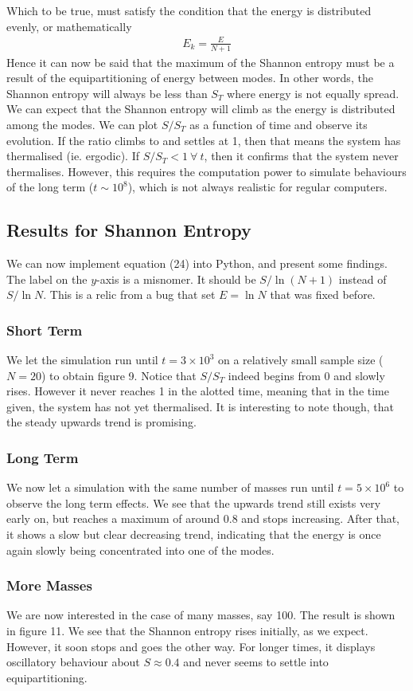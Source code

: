 \documentclass{article}
\begin{document}
Which to be true, must satisfy the condition that the energy is distributed evenly, or mathematically 
\begin{align}
    E_k=\frac{E}{N+1}
\end{align}
Hence it can now be said that the maximum of the Shannon entropy must be a result of 
the equipartitioning of energy between modes. In other words, the Shannon entropy will always be less than $S_T$ where 
energy is not equally spread.  We can expect that the Shannon entropy will climb as the energy is distributed among the modes. 
We can plot $S/S_T$ as a function of time and observe its evolution. If the ratio climbs to and settles at 
1, then that means the system has thermalised (ie. ergodic). If $S/S_T<1\ \forall \ t$, then it confirms that the system never 
thermalises. However, this requires the computation power to simulate behaviours of the long term ($t\sim10^8$), 
which is not always realistic for regular computers.
\newpage 
\subsection{Results for Shannon Entropy}
We can now implement equation (24) into Python, and present some findings.
 The label on the $y$-axis is a misnomer. 
It should be $S/\ln(N+1)$ instead of $S/\ln N$. This is a relic
from a bug that set $E=\ln N$ that was fixed before. 
\subsubsection{Short Term}
We let the simulation run until $t=3\times10^3$ on a relatively small sample size ($N=20$) to obtain figure 9. Notice that $S/S_T$ indeed 
begins from 0 and slowly rises. However it never reaches 1 in the alotted time, 
meaning that in the time given, the system has not yet thermalised. It is interesting to note though, 
that the steady upwards trend is promising.
\subsubsection{Long Term}
We now let a simulation with the same number of masses run until $t=5\times10^6$ to observe the long term effects.
 We see that the upwards trend 
still exists very early on, but reaches a maximum of around 0.8 and stops increasing. After that, it shows a slow but clear decreasing trend, indicating that 
the energy is once again slowly being concentrated into one of the modes. 
\subsubsection{More Masses}
We are now interested in the case of many masses, say 100. The result is shown in figure 11.
We see that the Shannon entropy rises initially, as we expect. However, it soon stops and goes the other way. 
For longer times, it displays oscillatory behaviour about $S\approx0.4$ and never seems to settle into equipartitioning. 
\end{document}
